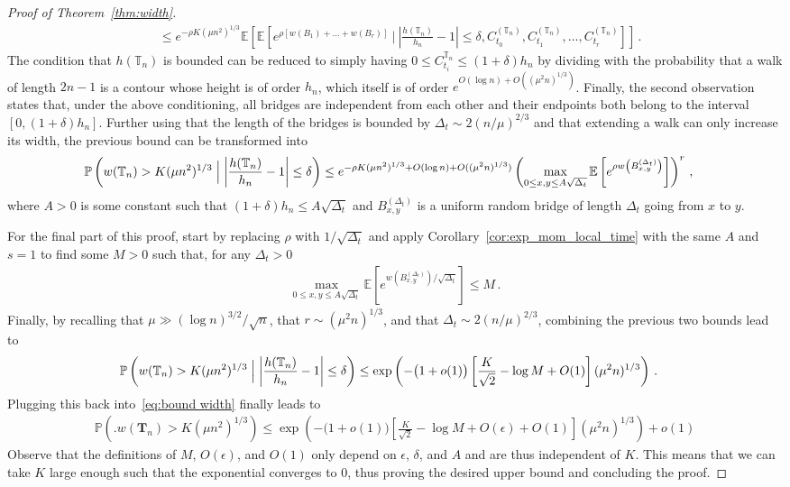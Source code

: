 \documentclass[10pt,a4paper]{amsart}
\newcommand{\CProb}[2]{\pr\left(#1 \Bigm| #2\right)}	%
\newcommand{\E}{\mathbb{E}}								%
\newcommand{\Exp}[1]{\E\left[#1\right]}					%
\newcommand{\Prob}[1]{\pr\left(#1\right)}					%
\newcommand{\T}{\mathbb T}
\newcommand{\bT}{\mathbf T}
\newcommand{\pr}{\mathbb{P}}								%
\begin{document}
\begin{proof}[Proof of Theorem~\ref{thm:width}]
\begin{align*}
        &\leq e^{-\rho K(\mu n^2)^{1/3}}\Exp{\Exp{e^{\rho\left[w(B_1)+\ldots+w(B_r)\right]}~\bigg|~\left|\frac{h(\T_n)}{h_n}-1\right|\leq\delta,C^{(\T_n)}_{t_0},C^{(\T_n)}_{t_1},\ldots,C^{(\T_n)}_{t_r}}}\,.
    \end{align*}
    The condition that $h(\T_n)$ is bounded can be reduced to simply having $0\leq C^{\T_n}_{t_i}\leq(1+\delta)h_n$ by dividing with the probability that a walk of length $2n-1$ is a contour whose height is of order $h_n$, which itself is of order $e^{O(\log n)+O((\mu^2n)^{1/3})}$.
    Finally, the second observation states that, under the above conditioning, all bridges are independent from each other and their endpoints both belong to the interval $[0,(1+\delta)h_n]$.
    Further using that the length of the bridges is bounded by $\Delta_t\sim2(n/\mu)^{2/3}$ and that extending a walk can only increase its width, the previous bound can be transformed into
    \begin{align*}
        \CProb{w(\T_n)>K(\mu n^2)^{1/3}}{\left|\frac{h(\T_n)}{h_n}-1\right|\leq\delta}
        &\leq e^{-\rho K(\mu n^2)^{1/3}+O(\log n)+O((\mu^2n)^{1/3})}\left(\max_{0\leq x,y\leq A\sqrt{\Delta_t}}\Exp{e^{\rho w\left(B^{(\Delta_t)}_{x,y}\right)}}\right)^r\,,
    \end{align*}
    where $A>0$ is some constant such that $(1+\delta)h_n\leq A\sqrt{\Delta_t}$ and $B^{(\Delta_t)}_{x,y}$ is a uniform random bridge of length $\Delta_t$ going from $x$ to $y$.

    For the final part of this proof, start by replacing $\rho$ with $1/\sqrt{\Delta_t}$ and apply Corollary~\ref{cor:exp_mom_local_time} with the same $A$ and $s=1$ to find some $M>0$ such that, for any $\Delta_t>0$
    \begin{align*}
        \max_{0\leq x,y\leq A\sqrt{\Delta_t}}\Exp{e^{w\left(B^{(\Delta_t)}_{x,y}\right)/\sqrt{\Delta_t}}}\leq M\,.
    \end{align*}
    Finally, by recalling that $\mu\gg(\log n)^{3/2}/\sqrt{n}$, that $r\sim(\mu^2n)^{1/3}$, and that $\Delta_t\sim2(n/\mu)^{2/3}$, combining the previous two bounds lead to
    \begin{align*}
        \CProb{w(\T_n)>K(\mu n^2)^{1/3}}{\left|\frac{h(\T_n)}{h_n}-1\right|\leq\delta}&\leq\exp\left(-\big(1+o(1)\big)\left[\frac{K}{\sqrt{2}}-\log M+O(1)\right](\mu^2n)^{1/3}\right)\,.
    \end{align*}
    Plugging this back into~\eqref{eq:bound width} finally leads to
    \begin{align*}
        \Prob{\Big.w(\bT_n)>K(\mu n^2)^{1/3}}\leq\exp\left(-\big(1+o(1)\big)\left[\frac{K}{\sqrt{2}}-\log M+O(\epsilon)+O(1)\right](\mu^2n)^{1/3}\right)+o(1)
    \end{align*}
    Observe that the definitions of $M$, $O(\epsilon)$, and $O(1)$ only depend on $\epsilon$, $\delta$, and $A$ and are thus independent of $K$.
    This means that we can take $K$ large enough such that the exponential converges to $0$, thus proving the desired upper bound and concluding the proof.
\end{proof}
\end{document}
